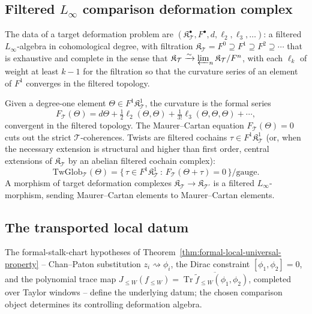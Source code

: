 \subsection{Filtered \texorpdfstring{$L_\infty$}{Linfty} comparison deformation complex}\label{ssec:master-deformation-target}

The data of a target deformation problem are
\((\mathfrak K_{\mathcal T}^\bullet,F^\bullet,d,\ell_2,\ell_3,\dots)\):
a filtered \(L_\infty\)-algebra in cohomological degree, with
filtration
\(\mathfrak K_{\mathcal T}=F^0\supseteq F^1\supseteq F^2\supseteq\cdots\)
that is exhaustive and complete in the sense that
\(\mathfrak K_{\mathcal T}\xrightarrow{\sim}\varprojlim_n
\mathfrak K_{\mathcal T}/F^n\), with each \(\ell_k\) of weight at
least \(k-1\) for the filtration so that the curvature series of an
element of \(F^1\) converges in the filtered topology.

Given a degree-one element \(\Theta\in F^1\mathfrak K_{\mathcal T}^1\),
the curvature is the formal series
\[
  F_{\mathcal T}(\Theta)
  =d\Theta
   +\tfrac12\ell_2(\Theta,\Theta)
   +\tfrac1{3!}\ell_3(\Theta,\Theta,\Theta)+\cdots,
\]
convergent in the filtered topology.  The Maurer--Cartan equation
\(F_{\mathcal T}(\Theta)=0\) cuts out the strict
\(\mathcal T\)-coherences.  Twists are filtered cochains
\(\tau\in F^1\mathfrak K_{\mathcal T}^1\) (or, when the necessary
extension is structural and higher than first order, central extensions of
\(\mathfrak K_{\mathcal T}\) by an abelian filtered cochain
complex):
\[
  \mathrm{TwGlob}_{\mathcal T}(\Theta)
  =\bigl\{\,\tau\in F^1\mathfrak K_{\mathcal T}^1
   \,:\,F_{\mathcal T}(\Theta+\tau)=0
   \,\bigr\}\big/\mathrm{gauge} .
\]
A morphism of target deformation complexes
\(\mathfrak K_{\mathcal T}\to\mathfrak K_{\mathcal T'}\) is a filtered
\(L_\infty\)-morphism, sending Maurer--Cartan elements to
Maurer--Cartan elements.

\subsection{The transported local datum}\label{ssec:master-deformation-local-datum}

The formal-stalk-chart hypotheses of
Theorem~\ref{thm:formal-local-universal-property} -- Chan--Paton
substitution \(z_i\rightsquigarrow\phi_i\), the Dirac constraint
\([\phi_1,\phi_2]=0\), and the polynomial trace map
\(J_{\leq W}(f_{\leq W})
=\overline{\operatorname{Tr}\tilde f_{\leq W}(\phi_1,\phi_2)}\), completed
over Taylor windows -- define the underlying datum; the chosen comparison
object determines its controlling deformation algebra.

